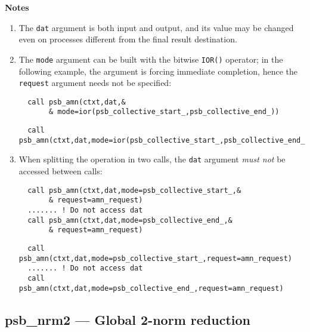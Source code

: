 {\par\noindent\large\bfseries Notes}
\begin{enumerate}
\item The \verb|dat| argument is both input and output, and its
  value may be changed even on processes different from the final
  result destination.
\item The \verb|mode| argument can be built with the bitwise
  \verb|IOR()| operator; in the following example, the   argument is
  forcing immediate completion, hence the \verb|request| argument
  needs not be specified: 
\ifpdf
\begin{verbatim}
  call psb_amn(ctxt,dat,&
       & mode=ior(psb_collective_start_,psb_collective_end_))
\end{verbatim}
\else
\begin{center}
    \begin{minipage}[tl]{0.9\textwidth}
\begin{verbatim} 
  call psb_amn(ctxt,dat,mode=ior(psb_collective_start_,psb_collective_end_))
\end{verbatim}
    \end{minipage}
  \end{center}
\fi
  
\item When splitting the operation in two calls, the \verb|dat|
  argument  \emph{must not} be accessed between calls:
\ifpdf
\begin{verbatim}
  call psb_amn(ctxt,dat,mode=psb_collective_start_,&
       & request=amn_request)
  ....... ! Do not access dat 
  call psb_amn(ctxt,dat,mode=psb_collective_end_,&
       & request=amn_request)
\end{verbatim}
\else
\begin{center}
    \begin{minipage}[tl]{0.9\textwidth}
\begin{verbatim} 
  call psb_amn(ctxt,dat,mode=psb_collective_start_,request=amn_request)
  ....... ! Do not access dat 
  call psb_amn(ctxt,dat,mode=psb_collective_end_,request=amn_request)
\end{verbatim}
    \end{minipage}
  \end{center}
\fi
\end{enumerate}

\clearpage\subsection{psb\_nrm2 --- Global 2-norm reduction}

